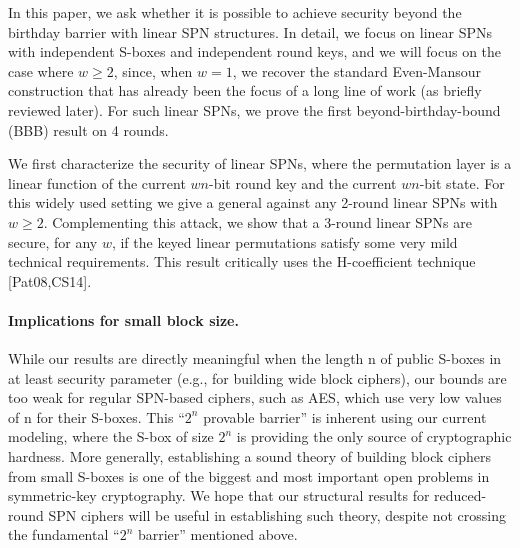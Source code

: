 In this paper, we ask whether it is possible to achieve security beyond the birthday barrier with linear SPN structures. In detail, we focus on linear SPNs with independent S-boxes and independent round keys, and we will focus on the case where $w\geq2$, since, when $w = 1$, we recover the standard Even-Mansour construction that has already been the focus
of a long line of work (as briefly reviewed later). For such linear SPNs, we prove the first beyond-birthday-bound (BBB) result on 4 rounds.





We first characterize the security of linear SPNs, where the
permutation layer is a linear function of the current $wn$-bit round key and the current $wn$-bit state. For this widely used setting we give a
general against any 2-round linear SPNs with $w\geq2$. Complementing this
attack, we show that a 3-round linear SPNs are secure, for any $w$, if the keyed linear permutations satisfy some very mild technical requirements. This result critically uses the H-coefficient technique [Pat08,CS14].





\paragraph{Implications for small block size.}

While our results are directly meaningful
when the length n of public S-boxes in at least security parameter (e.g., for
building wide block ciphers), our bounds are too weak for regular SPN-based
ciphers, such as AES, which use very low values of n for their S-boxes.
This ``$2^n$ provable barrier'' is inherent using our current modeling, where the
S-box of size $2^n$ is providing the only source of cryptographic hardness. More
generally, establishing a sound theory of building block ciphers from small S-boxes is one of the biggest and most important open problems in symmetric-key
cryptography. We hope that our structural results for reduced-round SPN ciphers will be useful in establishing such theory, despite not crossing the fundamental ``$2^n$ barrier'' mentioned above.



%
%
%



